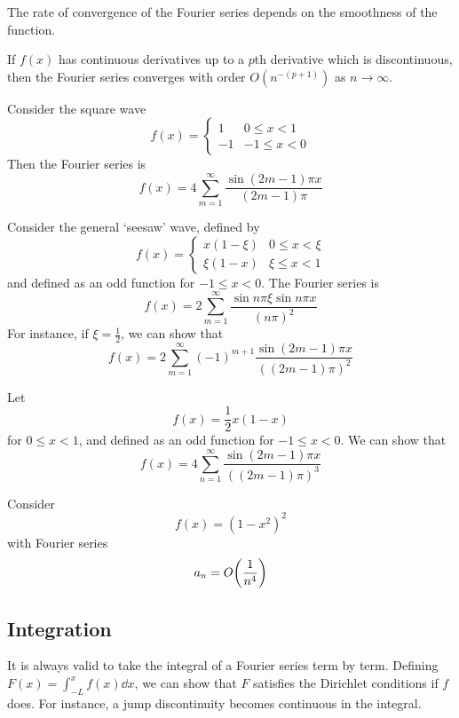 The rate of convergence of the Fourier series depends on the smoothness of the function.
\begin{theorem}
	If \( f(x) \) has continuous derivatives up to a \( p \)th derivative which is discontinuous, then the Fourier series converges with order \( O(n^{-(p+1)}) \) as \( n \to \infty \).
\end{theorem}
\begin{example}[\( p = 0 \)]
	Consider the square wave
	\[
		f(x) = \begin{cases}
			1  & 0 \leq x < 1  \\
			-1 & -1 \leq x < 0
		\end{cases}
	\]
	Then the Fourier series is
	\[
		f(x) = 4 \sum_{m=1}^\infty \frac{\sin (2m-1)\pi x}{(2m-1)\pi}
	\]
\end{example}
\begin{example}[\( p = 1 \)]
	Consider the general `seesaw' wave, defined by
	\[
		f(x) = \begin{cases}
			x(1 - \xi) & 0 \leq x < \xi \\
			\xi(1 - x) & \xi \leq x < 1
		\end{cases}
	\]
	and defined as an odd function for \( -1 \leq x < 0 \).
	The Fourier series is
	\[
		f(x) = 2 \sum_{m=1}^\infty \frac{\sin n\pi \xi \sin n\pi x}{(n \pi)^2}
	\]
	For instance, if \( \xi = \frac{1}{2} \), we can show that
	\[
		f(x) = 2 \sum_{m=1}^\infty (-1)^{m+1} \frac{\sin (2m-1)\pi x}{((2m-1)\pi)^2}
	\]
\end{example}
\begin{example}[\( p = 2 \)]
	Let
	\[
		f(x) = \frac{1}{2} x(1-x)
	\]
	for \( 0 \leq x < 1 \), and defined as an odd function for \( -1 \leq x < 0 \).
	We can show that
	\[
		f(x) = 4\sum_{n=1}^\infty \frac{\sin(2m - 1)\pi x}{((2m-1)\pi)^3}
	\]
\end{example}
\begin{example}[\( p = 3 \)]
	Consider
	\[
		f(x) = (1-x^2)^2
	\]
	with Fourier series
	\[
		a_n = O\qty(\frac{1}{n^4})
	\]
\end{example}

\subsection{Integration}
It is always valid to take the integral of a Fourier series term by term.
Defining \( F(x) = \int_{-L}^x f(x) \dd{x} \), we can show that \( F \) satisfies the Dirichlet conditions if \( f \) does.
For instance, a jump discontinuity becomes continuous in the integral.

